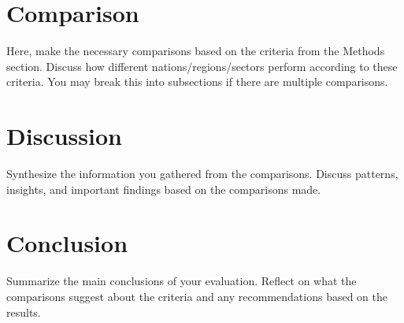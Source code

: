 \documentclass[12pt]{article}
\begin{document}
\section*{Comparison}
Here, make the necessary comparisons based on the criteria from the Methods section. Discuss how different nations/regions/sectors perform according to these criteria. You may break this into subsections if there are multiple comparisons.

\section*{Discussion}
Synthesize the information you gathered from the comparisons. Discuss patterns, insights, and important findings based on the comparisons made.

\section*{Conclusion}
Summarize the main conclusions of your evaluation. Reflect on what the comparisons suggest about the criteria and any recommendations based on the results.

\newpage
\printbibliography
\end{document}
